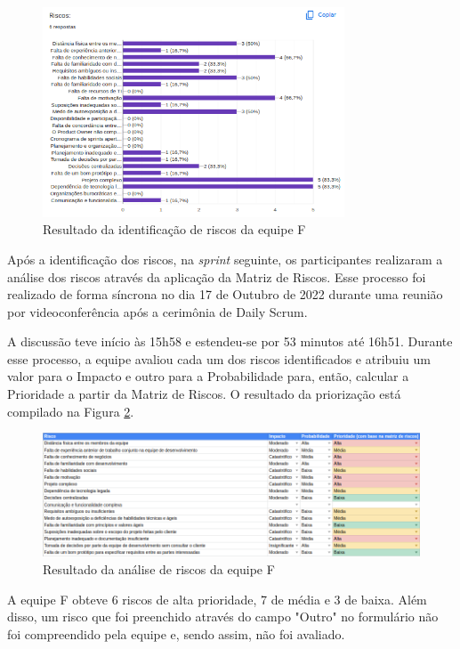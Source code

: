 \documentclass[
    12pt,       %
    openright,      %
    twoside,      %
    a4paper,      %
    english,      %
    french,       %
    spanish,      %
    brazil,       %
    ]{abntex2}
\begin{document}
\begin{figure}[H]
    \centering
    \includegraphics[width=0.8\textwidth]{src/tex/img/resultado-foundation.png}
    \caption{Resultado da identificação de riscos da equipe F}
    \label{fig:result_found}
\end{figure}

Após a identificação dos riscos, na \textit{sprint} seguinte, os participantes realizaram a análise dos riscos através da aplicação da Matriz de Riscos. Esse processo foi realizado de forma síncrona no dia 17 de Outubro de 2022 durante uma reunião por videoconferência após a cerimônia de Daily Scrum. 

A discussão teve início às 15h58 e estendeu-se por 53 minutos até 16h51. Durante esse processo, a equipe avaliou cada um dos riscos identificados e atribuiu um valor para o Impacto e outro para a Probabilidade para, então, calcular a Prioridade a partir da Matriz de Riscos. O resultado da priorização está compilado na Figura \ref{fig:result_found}.

\begin{figure}[H]
    \centering
    \includegraphics[width=1\textwidth]{src/tex/img/riscos_founds.png}
    \caption{Resultado da análise de riscos da equipe F}
    \label{fig:result_found}
\end{figure}

A equipe F obteve 6 riscos de alta prioridade, 7 de média e 3 de baixa. Além disso, um risco que foi preenchido através do campo "Outro" no formulário não foi compreendido pela equipe e, sendo assim, não foi avaliado.
\end{document}

